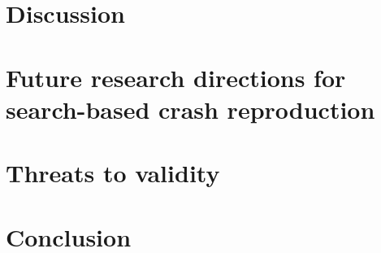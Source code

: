 \section{Discussion}
\label{sec:jcrashpack:discussion}


\section{Future research directions for search-based crash reproduction}
\label{sec:jcrashpack:futurework}


\section{Threats to validity}
\label{sec:jcrashpack:threats}


\section{Conclusion}
\label{sec:jcrashpack:conclusion}
